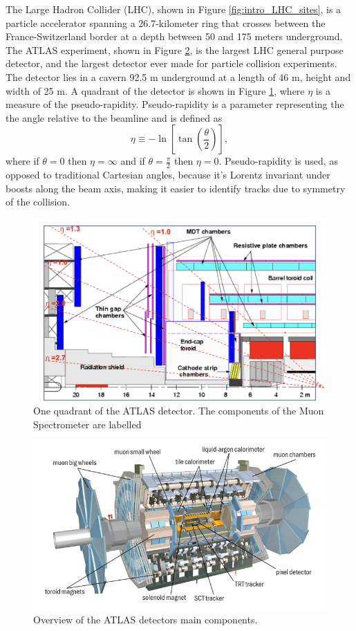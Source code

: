 The Large Hadron Collider (LHC), shown in Figure \ref{fig:intro_LHC_sites},  is a particle accelerator spanning a 26.7-kilometer ring that crosses between the France-Switzerland border at a depth between 50 and 175 meters underground.\cite{Brüning:782076}
The ATLAS experiment, shown in Figure \ref{fig:intro_ATLAS_detector}, is the largest LHC general purpose detector, and the largest detector ever made for particle collision experiments. 
The detector lies in a cavern 92.5 m underground at a length of 46 m, height and width of 25 m.\cite{ATLAS_Tech_Proposal}
A quadrant of the detector is shown in Figure \ref{fig:ATLAS_quadrant}, where $\eta$ is a measure of the pseudo-rapidity.
Pseudo-rapidity is a parameter representing the the angle relative to the beamline and is defined as
\begin{equation}
    \eta \equiv -\ln\left[ \tan\left(\frac{\theta}{2}\right)\right],
\end{equation}  
where if $\theta = 0$ then $\eta = \infty$ and if $\theta = \frac{\pi}{2}$ then $\eta = 0$.
Pseudo-rapidity is used, as opposed to traditional Cartesian angles, because it's Lorentz invariant under boosts along the beam axis, making it easier to identify tracks due to symmetry of the collision.  
\begin{figure}[h!]
    \centering
    \includegraphics[width=.8\textwidth]{content/img/ATLAS qudrant labelled MS.png}
    \caption{One quadrant of the ATLAS detector. The components of the Muon Spectrometer are labelled \cite{Hough_Transform_CSC}}
    \label{fig:ATLAS_quadrant}
\end{figure}

\begin{figure}[h]
    \centering
    \includegraphics[width=.8\textwidth]{content/img/ATLAS_Detector.jpg}
    \caption{Overview of the ATLAS detectors main components.\cite{ATLAS_Illustration}}
    \label{fig:intro_ATLAS_detector}
\end{figure}

